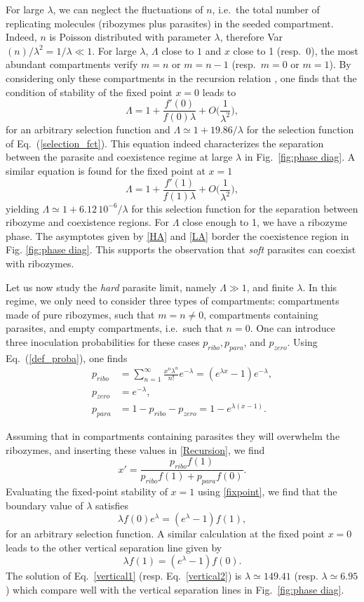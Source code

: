 \documentclass[twocolumn,showpacs,floatfix]{revtex4-1}
\newcommand{\be}{\begin{equation}}
\newcommand{\ee}{\end{equation}}
\begin{document}
For large $\lambda$, we can neglect the fluctuations of $n$, i.e.\ the total number of replicating molecules 
(ribozymes plus parasites) 
in the seeded compartment. Indeed, $n$ is Poisson distributed with parameter $\lambda$, therefore 
Var$(n)/\lambda^2 = 1/\lambda \ll 1$. 
For large $\lambda$, $\Lambda$ close to $1$ and $x$ close to 1 (resp.\ 0), the most abundant 
compartments verify $m=n$ or $m=n-1$ (resp.\ $m=0$ or $m=1$). By considering only these compartments 
in the recursion relation \cite{SM}, one finds that the condition of stability of the fixed point $x=0$ leads to
\be
\Lambda=1 +  \frac{f'(0)}{f(0) \lambda} + O\Big(\frac{1}{\lambda^{2}} \Big), \label{HA}
\ee
for an arbitrary selection function and $\Lambda \simeq 1+ 19.86/\lambda$ for the selection function of Eq.~(\ref{selection_fct}).
This equation indeed characterizes the separation between the parasite and coexistence regime at large $\lambda$ 
in Fig.~\ref{fig:phase diag}. A similar equation is found for the fixed point at $x=1$ 
\be
\Lambda=1 +  \frac{f'(1)}{f(1) \lambda} + O\Big(\frac{1}{\lambda^{2}} \Big), \label{LA}
\ee
yielding $\Lambda \simeq 1 + 6.12\, 10^{-6}/\lambda$ for this selection function for the separation between
ribozyme and coexistence regions. 
For $\Lambda$ close enough to 1, we have a ribozyme phase. 
The asymptotes given by \eqref{HA} and \eqref{LA} border the coexistence region in Fig. \ref{fig:phase diag}. This supports the observation that {\it soft} parasites can coexist with ribozymes.

Let us now study the {\it hard} parasite limit, namely $\Lambda\gg 1$, and finite $\lambda$. 
In this regime, we only need to consider three types of compartments: compartments made of pure ribozymes, such that $m=n \neq 0$, compartments containing parasites, and empty compartments, i.e.\ such that $n=0$.
One can introduce three inoculation probabilities for these cases $p_{ribo}, p_{para}$, and $p_{zero}$. 
Using Eq.~(\ref{def_proba}), one finds
\begin{equation}
\begin{split}
p_{ribo} &= \sum_{n=1}^{\infty} \frac{x^{n} \lambda^{n}}{n!} e^{-\lambda}=( e^{\lambda x} -1) e^{-\lambda}, \\
p_{zero} &= e^{-\lambda}, \\
p_{para} &= 1-p_{ribo}-p_{zero} = 1 -e^{\lambda (x-1)}.
\end{split}
\end{equation}

Assuming that in compartments containing parasites they will overwhelm the ribozymes, and inserting these values in \eqref{Recursion}, we find
\be
x'=  \frac{p_{ribo} f(1)}{ p_{ribo} f(1) + p_{para} f(0)}.
\ee
Evaluating the fixed-point stability of $x=1$  
using \eqref{fixpoint}, we find that the boundary value of $\lambda$ satisfies
\be
\lambda f(0) e^{\lambda} = ( e^{\lambda}-1 ) f(1),
\label{vertical1}
\ee
for an arbitrary selection function.  A similar calculation at the fixed point $x=0$ leads to the other vertical separation line given by
\be
\lambda f(1)=(e^{\lambda}-1)f(0).
\label{vertical2}
\ee
The solution of Eq.~\eqref{vertical1} (resp. Eq.~\eqref{vertical2}) is $\lambda \simeq 149.41$ (resp. $\lambda \simeq 6.95$) 
which compare well with the vertical separation lines in Fig.~\ref{fig:phase diag}. 
\end{document}

